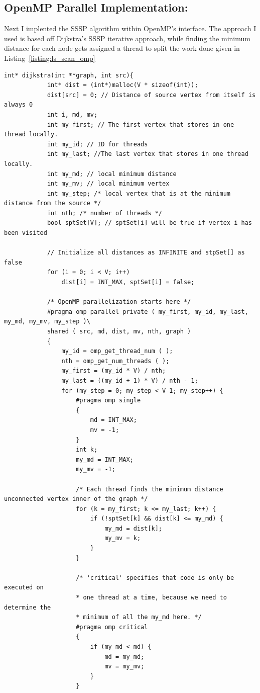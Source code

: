 	\subsection{OpenMP Parallel Implementation:}
	Next I implented the SSSP algorithm within OpenMP's interface. The approach I used is based off Dijkstra's SSSP iterative approach, while finding the minimum distance for each node gets assigned a thread to split the work done\cite{he2021parallelizing} given in Listing~\ref{listing:ls_scan_omp}
	\begin{lstlisting}[caption={OpenMP Parallel algorithm for computing SSSP\cite{he2021parallelizing}}, label={listing:ls_sssp_omp}]
		int* dijkstra(int **graph, int src){
			int* dist = (int*)malloc(V * sizeof(int));
			dist[src] = 0; // Distance of source vertex from itself is always 0
			int i, md, mv;
			int my_first; // The first vertex that stores in one thread locally. 
			int my_id; // ID for threads
			int my_last; //The last vertex that stores in one thread locally. 
			int my_md; // local minimum distance
			int my_mv; // local minimum vertex
			int my_step; /* local vertex that is at the minimum distance from the source */
			int nth; /* number of threads */
			bool sptSet[V]; // sptSet[i] will be true if vertex i has been visited
			
			// Initialize all distances as INFINITE and stpSet[] as false
			for (i = 0; i < V; i++)
				dist[i] = INT_MAX, sptSet[i] = false;
			
			/* OpenMP parallelization starts here */
			#pragma omp parallel private ( my_first, my_id, my_last, my_md, my_mv, my_step )\
			shared ( src, md, dist, mv, nth, graph )
			{
				my_id = omp_get_thread_num ( );
				nth = omp_get_num_threads ( );
				my_first = (my_id * V) / nth;
				my_last = ((my_id + 1) * V) / nth - 1;
				for (my_step = 0; my_step < V-1; my_step++) {
					#pragma omp single
					{
						md = INT_MAX;
						mv = -1;
					}
					int k;
					my_md = INT_MAX;
					my_mv = -1;
					
					/* Each thread finds the minimum distance unconnected vertex inner of the graph */
					for (k = my_first; k <= my_last; k++) {
						if (!sptSet[k] && dist[k] <= my_md) {
							my_md = dist[k];
							my_mv = k;
						}
					}
					
					/* 'critical' specifies that code is only be executed on 
					* one thread at a time, because we need to determine the 
					* minimum of all the my_md here. */
					#pragma omp critical
					{
						if (my_md < md) {
							md = my_md;
							mv = my_mv;
						}
					}
					

\end{lstlisting}
